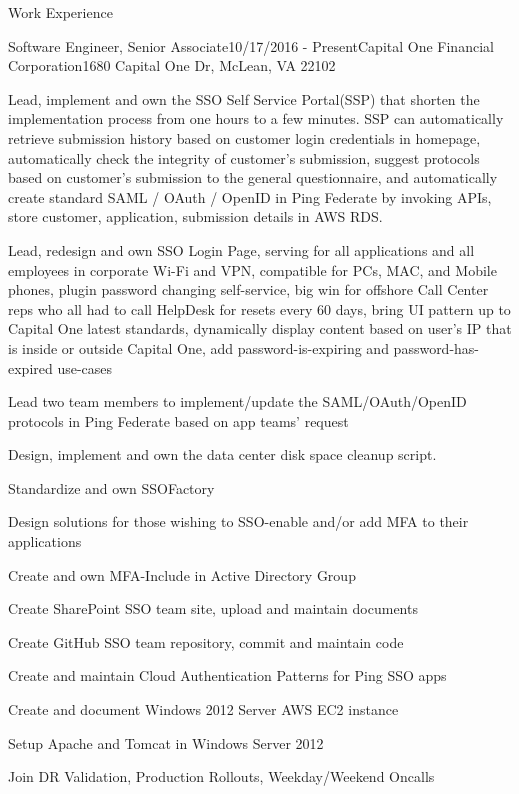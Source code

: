 \documentclass{resume} %
\begin{document}
\begin{rSection}{Work Experience}
\begin{rSubsection}{Software Engineer, Senior Associate}{10/17/2016 - Present}{Capital One Financial Corporation}{1680 Capital One Dr, McLean, VA 22102}

\item Lead, implement and own the SSO Self Service Portal(SSP) that shorten the implementation process from one hours to a few minutes. SSP can automatically retrieve submission history based on customer login credentials in homepage, automatically check the integrity of customer's submission, suggest protocols based on customer's submission to the general questionnaire, and automatically create standard SAML / OAuth / OpenID in Ping Federate by invoking APIs, store customer, application, submission details in AWS RDS. 

\item Lead, redesign and own SSO Login Page, serving for all applications and all employees in corporate Wi-Fi and VPN, compatible for PCs, MAC, and Mobile phones, plugin password changing self-service, big win for offshore Call Center reps who all had to call HelpDesk for resets every 60 days, bring UI pattern up to Capital One latest standards, dynamically display content based on user's IP that is inside or outside Capital One, add password-is-expiring and password-has-expired use-cases

\item Lead two team members to implement/update the SAML/OAuth/OpenID protocols in Ping Federate based on app teams' request

\item Design, implement and own the data center disk space cleanup script. 
\item Standardize and own SSOFactory 
\item Design solutions for those wishing to SSO-enable and/or add MFA to their applications
\item Create and own MFA-Include in Active Directory Group
\item Create SharePoint SSO team site, upload and maintain documents
\item Create GitHub SSO team repository, commit and maintain code
\item Create and maintain Cloud Authentication Patterns for Ping SSO apps
\item Create and document Windows 2012 Server AWS EC2 instance
\item Setup Apache and Tomcat in Windows Server 2012
\item Join DR Validation, Production Rollouts, Weekday/Weekend Oncalls


\end{rSubsection}
\end{rSection}
\end{document}
